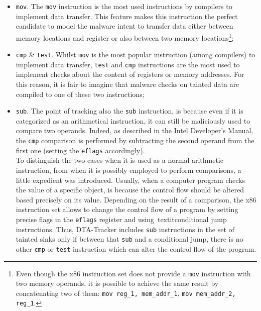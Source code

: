 \documentclass[LaM,binding=0.6cm]{sapthesis}
\begin{document}
\begin{itemize}
\item \texttt{mov}. The \texttt{mov} instruction is the most used instructions by compilers to implement data transfer. This feature makes this instruction the perfect candidate to model the malware intent to transfer data either between memory locations and register or also between two memory locations\footnote{Even though the x$86$ instruction set does not provide a \texttt{mov} instruction with two memory operands, it is possible to achieve the same result by concatenating two of them: \texttt{mov reg\_1, mem\_addr\_1}, \texttt{mov mem\_addr\_2, reg\_1}.};
\item \texttt{cmp} \& \texttt{test}. Whilst \texttt{mov} is the most popular instruction (among compilers) to implement data transfer, \texttt{test} and \texttt{cmp} instructions are the most used to implement checks about the content of registers or memory addresses. For this reason, it is fair to imagine that malware checks on tainted data are compiled to one of these two instructions;
\item \texttt{sub}. The point of tracking also the \texttt{sub} instruction, is because even if it is categorized as an arithmetical instruction, it can still be maliciously used to compare two operands. Indeed, as described in the Intel Developer's Manual\cite{intel2018intel}, the \texttt{cmp} comparison is performed by subtracting the second operand from the first one (setting the \texttt{eflags} accordingly).\\
To distinguish the two cases when it is used as a normal arithmetic instruction, from when it is possibly employed to perform comparisons, a little expedient was introduced. Usually, when a computer program checks the value of a specific object, is because the control flow should be altered based precisely on its value. Depending on the result of a comparison, the x$86$ instruction set allows to change the control flow of a program by setting precise flags in the \texttt{eflags} register and using\ textit{conditional jump} instructions. Thus, DTA-Tracker includes \texttt{sub} instructions in the set of tainted sinks only if between that \texttt{sub} and a conditional jump, there is no other \texttt{cmp} or \texttt{test} instruction which can alter the control flow of the program.
\end{itemize}
\end{document}
